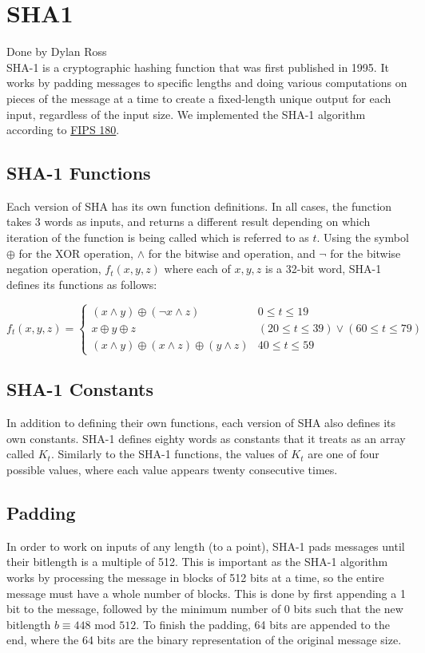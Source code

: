 \section{SHA1}\label{sec:sha}
Done by Dylan Ross\\

	\medskip
	SHA-1 is a cryptographic hashing function that was first published in 1995. It works by padding messages to specific lengths and doing various
	computations on pieces of the message at a time to create a fixed-length unique output for each input, regardless of the input size. We implemented the SHA-1 algorithm according to 
	\href{https://nvlpubs.nist.gov/nistpubs/FIPS/NIST.FIPS.180-4.pdf}{FIPS 180}.

	\subsection{SHA-1 Functions}\label{sec:sha-functions}
		Each version of SHA has its own function definitions. In all cases, the function takes 3 words as inputs, and returns a different result depending on which iteration of the function
		is being called which is referred to as $t$. Using the symbol $\oplus$ for the XOR operation, $\land$ for the bitwise and operation, and $\neg$ for the bitwise negation operation, 
		$f_t(x,y,z)$ where each of $x,y,z$ is a 32-bit word, SHA-1 defines its functions as follows:
		\begin{center}
			$f_t(x,y,z) = \begin{cases}
				(x\land y) \oplus (\neg x\land z) & 0\le t\le19\\
				x\oplus y\oplus z & (20\le t\le39) \lor (60\le t\le79)\\
				(x\land y) \oplus (x\land z) \oplus (y\land z) & 40\le t\le59
				\end{cases}	 
			$
		\end{center}   

	\subsection{SHA-1 Constants}\label{sec:sha-constants}
		In addition to defining their own functions, each version of SHA also defines its own constants. SHA-1 defines eighty words as constants that it treats as an array called $K_t$. Similarly
		to the SHA-1 functions, the values of $K_t$ are one of four possible values, where each value appears twenty consecutive times.

	\subsection{Padding}\label{sec:sha-padding}
		In order to work on inputs of any length (to a point), SHA-1 pads messages until their bitlength is a multiple of 512. This is important as the SHA-1 algorithm works by processing the
		message in blocks of 512 bits at a time, so the entire message must have a whole number of blocks. This is done by first appending a 1 bit to the message, followed by the minimum number
		of 0 bits such that the new bitlength $b\equiv448\text{ mod }512$. To finish the padding, 64 bits are appended to the end, where the 64 bits are the binary representation of the
		original message size.

